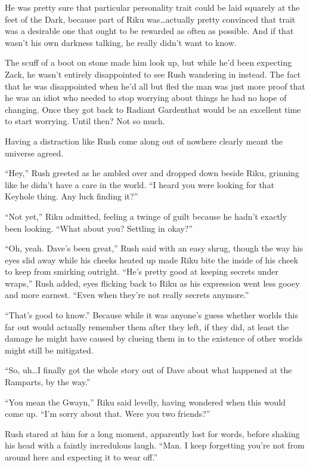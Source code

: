 He was pretty sure that particular personality trait could be laid squarely at the feet of the Dark, because part of Riku was\ldots actually pretty convinced that trait was a desirable one that ought to be rewarded as often as possible. And if that wasn't his own darkness talking, he really didn't want to know.

The scuff of a boot on stone made him look up, but while he'd been expecting Zack, he wasn't entirely disappointed to see Rush wandering in instead. The fact that he was disappointed when he'd all but fled the man was just more proof that he was an idiot who needed to stop worrying about things he had no hope of changing. Once they got back to Radiant Garden\textemdash that would be an excellent time to start worrying. Until then? Not so much.

Having a distraction like Rush come along out of nowhere clearly meant the universe agreed.

``Hey,'' Rush greeted as he ambled over and dropped down beside Riku, grinning like he didn't have a care in the world. ``I heard you were looking for that Keyhole thing. Any luck finding it?''

``Not yet,'' Riku admitted, feeling a twinge of guilt because he hadn't exactly been looking. ``What about you? Settling in okay?''

``Oh, yeah. Dave's been great,'' Rush said with an easy shrug, though the way his eyes slid away while his cheeks heated up made Riku bite the inside of his cheek to keep from smirking outright. ``He's pretty good at keeping secrets under wraps,'' Rush added, eyes flicking back to Riku as his expression went less gooey and more earnest. ``Even when they're not really secrets anymore.''

``That's good to know.'' Because while it was anyone's guess whether worlds this far out would actually remember them after they left, if they did, at least the damage he might have caused by clueing them in to the existence of other worlds might still be mitigated.

``So, uh\ldots I finally got the whole story out of Dave about what happened at the Ramparts, by the way.''

``You mean the Gwayn,'' Riku said levelly, having wondered when this would come up. ``I'm sorry about that. Were you two friends?''

Rush stared at him for a long moment, apparently lost for words, before shaking his head with a faintly incredulous laugh. ``Man. I keep forgetting you're not from around here and expecting it to wear off.''

